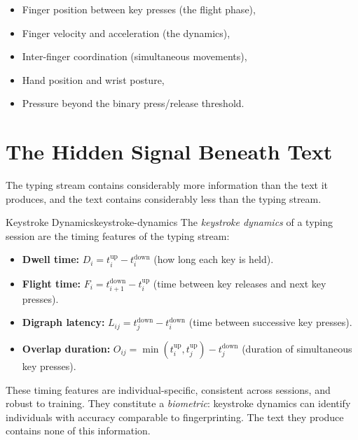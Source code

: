 \begin{itemize}
  \item Finger position between key presses (the flight phase),
  \item Finger velocity and acceleration (the dynamics),
  \item Inter-finger coordination (simultaneous movements),
  \item Hand position and wrist posture,
  \item Pressure beyond the binary press/release threshold.
\end{itemize}

\section{The Hidden Signal Beneath Text}

The typing stream contains considerably more information than the
text it produces, and the text contains considerably less than the
typing stream.

\begin{definition}{Keystroke Dynamics}{keystroke-dynamics}
  The \emph{keystroke dynamics} of a typing session are the timing
  features of the typing stream:
  \begin{itemize}
    \item \textbf{Dwell time:} $D_i = t_i^\text{up} - t_i^\text{down}$
          (how long each key is held).
    \item \textbf{Flight time:} $F_i = t_{i+1}^\text{down} - t_i^\text{up}$
          (time between key releases and next key presses).
    \item \textbf{Digraph latency:} $L_{ij} = t_j^\text{down} - t_i^\text{down}$
          (time between successive key presses).
    \item \textbf{Overlap duration:} $O_{ij} = \min(t_i^\text{up}, t_j^\text{up})
          - t_j^\text{down}$ (duration of simultaneous key presses).
  \end{itemize}
\end{definition}

These timing features are individual-specific, consistent across sessions,
and robust to training. They constitute a \emph{biometric}: keystroke
dynamics can identify individuals with accuracy comparable to fingerprinting.
The text they produce contains none of this information.

